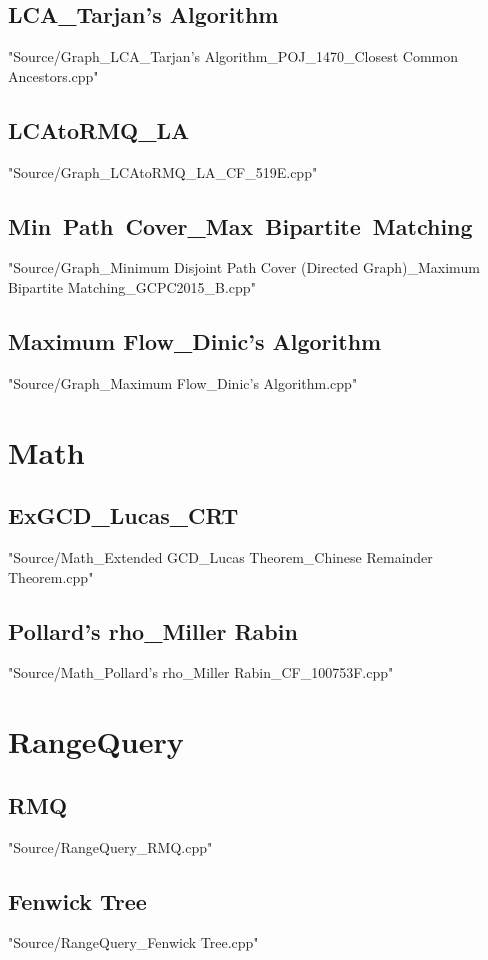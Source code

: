\documentclass [12pt,twocolumn,oneside]{article}
\begin{document}
\subsection{LCA\_Tarjan's Algorithm}
 {"Source/Graph_LCA_Tarjan's Algorithm_POJ_1470_Closest Common Ancestors.cpp"}
\subsection{LCAtoRMQ\_LA}
 {"Source/Graph_LCAtoRMQ_LA_CF_519E.cpp"}
\subsection{Min\ Path\ Cover\_Max\ Bipartite\ Matching}
 {"Source/Graph_Minimum Disjoint Path Cover (Directed Graph)_Maximum Bipartite Matching_GCPC2015_B.cpp"}
\subsection{Maximum Flow\_Dinic's Algorithm}
 {"Source/Graph_Maximum Flow_Dinic's Algorithm.cpp"}

\newpage
\section{Math}
\subsection{ExGCD\_Lucas\_CRT}
 {"Source/Math_Extended GCD_Lucas Theorem_Chinese Remainder Theorem.cpp"}
\subsection{Pollard's rho\_Miller Rabin}
 {"Source/Math_Pollard's rho_Miller Rabin_CF_100753F.cpp"}

\newpage
\section{RangeQuery}
\subsection{RMQ}
 {"Source/RangeQuery_RMQ.cpp"}
\subsection{Fenwick Tree}
 {"Source/RangeQuery_Fenwick Tree.cpp"}
\end{document}
